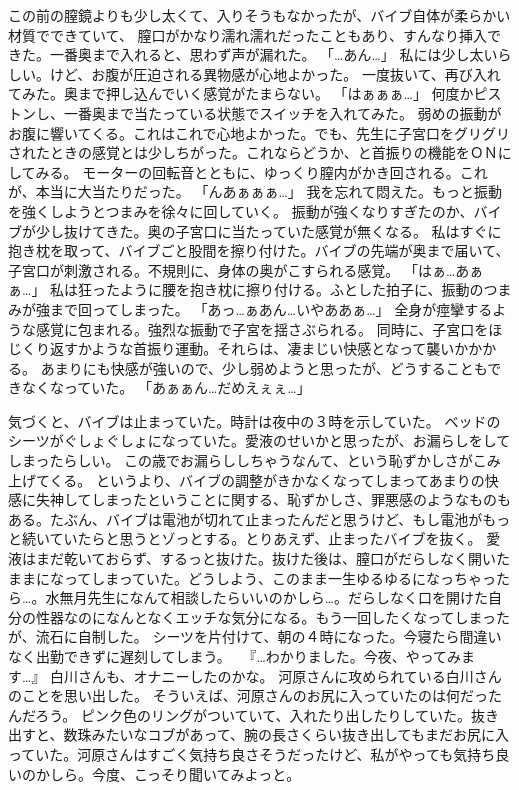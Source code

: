 この前の膣鏡よりも少し太くて、入りそうもなかったが、バイブ自体が柔らかい材質でできていて、
膣口がかなり濡れ濡れだったこともあり、すんなり挿入できた。一番奥まで入れると、思わず声が漏れた。
「…あん…」
私には少し太いらしい。けど、お腹が圧迫される異物感が心地よかった。
一度抜いて、再び入れてみた。奥まで押し込んでいく感覚がたまらない。
「はぁぁぁ…」
何度かピストンし、一番奥まで当たっている状態でスイッチを入れてみた。
弱めの振動がお腹に響いてくる。これはこれで心地よかった。でも、先生に子宮口をグリグリされたときの感覚とは少しちがった。これならどうか、と首振りの機能をＯＮにしてみる。
モーターの回転音とともに、ゆっくり膣内がかき回される。これが、本当に大当たりだった。
「んあぁぁぁ…」
我を忘れて悶えた。もっと振動を強くしようとつまみを徐々に回していく。
振動が強くなりすぎたのか、バイブが少し抜けてきた。奥の子宮口に当たっていた感覚が無くなる。
私はすぐに抱き枕を取って、バイブごと股間を擦り付けた。バイブの先端が奥まで届いて、
子宮口が刺激される。不規則に、身体の奥がこすられる感覚。
「はぁ…あぁぁ…」
私は狂ったように腰を抱き枕に擦り付ける。ふとした拍子に、振動のつまみが強まで回ってしまった。
「あっ…ぁあん…いやああぁ…」
全身が痙攣するような感覚に包まれる。強烈な振動で子宮を揺さぶられる。
同時に、子宮口をほじくり返すかような首振り運動。それらは、凄まじい快感となって襲いかかかる。
あまりにも快感が強いので、少し弱めようと思ったが、どうすることもできなくなっていた。
「あぁぁん…だめえぇぇ…」

気づくと、バイブは止まっていた。時計は夜中の３時を示していた。
ベッドのシーツがぐしょぐしょになっていた。愛液のせいかと思ったが、お漏らしをしてしまったらしい。
この歳でお漏らししちゃうなんて、という恥ずかしさがこみ上げてくる。
というより、バイブの調整がきかなくなってしまってあまりの快感に失神してしまったということに関する、恥ずかしさ、罪悪感のようなものもある。たぶん、バイブは電池が切れて止まったんだと思うけど、もし電池がもっと続いていたらと思うとゾっとする。とりあえず、止まったバイブを抜く。
愛液はまだ乾いておらず、するっと抜けた。抜けた後は、膣口がだらしなく開いたままになってしまっていた。どうしよう、このまま一生ゆるゆるになっちゃったら…。水無月先生になんて相談したらいいのかしら…。だらしなく口を開けた自分の性器なのになんとなくエッチな気分になる。もう一回したくなってしまったが、流石に自制した。
シーツを片付けて、朝の４時になった。今寝たら間違いなく出勤できずに遅刻してしまう。
　『…わかりました。今夜、やってみます…』
白川さんも、オナニーしたのかな。
河原さんに攻められている白川さんのことを思い出した。
そういえば、河原さんのお尻に入っていたのは何だったんだろう。
ピンク色のリングがついていて、入れたり出したりしていた。抜き出すと、数珠みたいなコブがあって、腕の長さくらい抜き出してもまだお尻に入っていた。河原さんはすごく気持ち良さそうだったけど、私がやっても気持ち良いのかしら。今度、こっそり聞いてみよっと。




